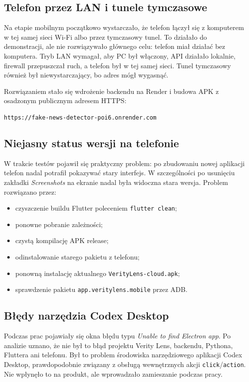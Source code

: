 \documentclass[12pt,a4paper]{article}
\begin{document}
\subsection{Telefon przez LAN i tunele tymczasowe}
Na etapie mobilnym początkowo wystarczało, że telefon łączył się z komputerem w tej samej sieci Wi-Fi albo przez tymczasowy tunel.
To działało do demonstracji, ale nie rozwiązywało głównego celu: telefon miał działać bez komputera.
Tryb LAN wymagał, aby PC był włączony, API działało lokalnie, firewall przepuszczał ruch, a telefon był w tej samej sieci.
Tunel tymczasowy również był niewystarczający, bo adres mógł wygasnąć.

Rozwiązaniem stało się wdrożenie backendu na Render i budowa APK z osadzonym publicznym adresem HTTPS:
\begin{center}
\texttt{https://fake-news-detector-poi6.onrender.com}
\end{center}

\subsection{Niejasny status wersji na telefonie}
W trakcie testów pojawił się praktyczny problem: po zbudowaniu nowej aplikacji telefon nadal potrafił pokazywać stary interfejs.
W szczególności po usunięciu zakładki \textit{Screenshots} na ekranie nadal była widoczna stara wersja.
Problem rozwiązano przez:
\begin{itemize}
  \item czyszczenie buildu Flutter poleceniem \texttt{flutter clean};
  \item ponowne pobranie zależności;
  \item czystą kompilację APK release;
  \item odinstalowanie starego pakietu z telefonu;
  \item ponowną instalację aktualnego \texttt{VerityLens-cloud.apk};
  \item sprawdzenie pakietu \texttt{app.veritylens.mobile} przez ADB.
\end{itemize}

\subsection{Błędy narzędzia Codex Desktop}
Podczas prac pojawiały się okna błędu typu \textit{Unable to find Electron app}.
Po analizie uznano, że nie był to błąd projektu Verity Lens, backendu, Pythona, Fluttera ani telefonu.
Był to problem środowiska narzędziowego aplikacji Codex Desktop, prawdopodobnie związany z obsługą wewnętrznych akcji \texttt{click}/\texttt{action}.
Nie wpłynęło to na produkt, ale wprowadzało zamieszanie podczas pracy.
\end{document}
